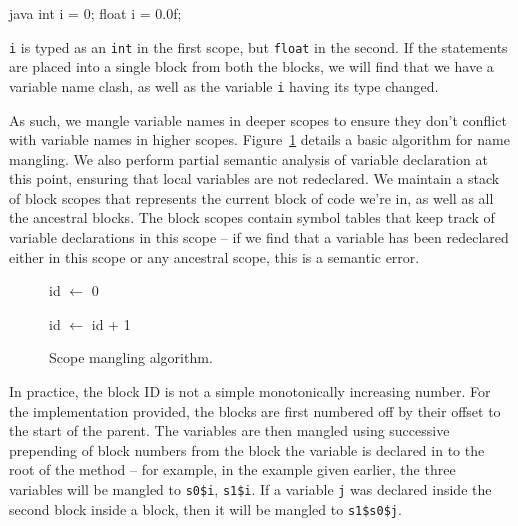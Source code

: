 \documentclass[journal,a4paper]{IEEEtran}
\begin{document}
\begin{pygmented}{java}
{
    int i = 0;
}
{
    float i = 0.0f;
}
\end{pygmented}

\texttt{i} is typed as an \texttt{int} in the first scope, but \texttt{float} in the second. If
the statements are placed into a single block from both the blocks, we will find that we have a
variable name clash, as well as the variable \texttt{i} having its type changed.

As such, we mangle variable names in deeper scopes to ensure they don't conflict with variable
names in higher scopes. Figure~\ref{algorithm:scope-mangling} details a basic algorithm for name
mangling. We also perform partial semantic analysis of variable declaration at this point, ensuring
that local variables are not redeclared. We maintain a stack of block scopes that represents the
current block of code we're in, as well as all the ancestral blocks. The block scopes contain
symbol tables that keep track of variable declarations in this scope -- if we find that a variable
has been redeclared either in this scope or any ancestral scope, this is a semantic error.

\begin{figure}
\begin{algorithmic}
    \State id $\gets$ 0
            \State {}
        \EndFor

                \State {}
            \EndFor
        \EndFor
        \State id $\gets$ id + 1
    \EndFor
\EndFunction
\end{algorithmic}
\caption{Scope mangling algorithm.}
\label{algorithm:scope-mangling}
\end{figure}

In practice, the block ID is not a simple monotonically increasing number. For the implementation
provided, the blocks are first numbered off by their offset to the start of the parent. The
variables are then mangled using successive prepending of block numbers from the block the variable
is declared in to the root of the method -- for example, in the example given earlier, the three
variables will be mangled to \texttt{s0\$i}, \texttt{s1\$i}. If a variable \texttt{j} was declared
inside the second block inside a block, then it will be mangled to \texttt{s1\$s0\$j}.
\end{document}
